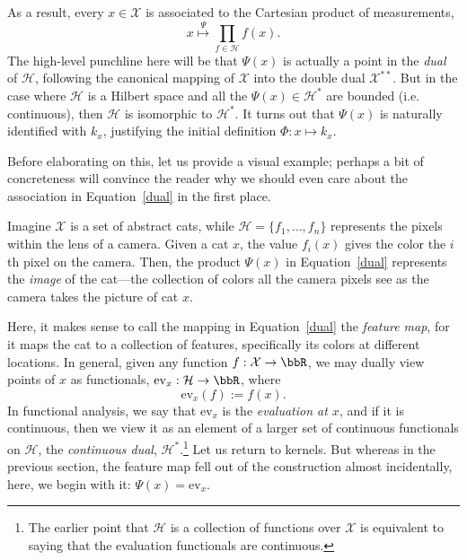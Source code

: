 \documentclass[twoside,11pt]{homework}
\begin{document}
\begin{multicols}{2}
As a result, every $x \in \mathcal{X}$ is associated to the Cartesian product of measurements,
\begin{equation}\label{dual}
  x \overset{\Psi}{\mapsto}\prod_{f \in \mathcal{H}} f(x).
\end{equation}
The high-level punchline here will be that $\Psi(x)$ is actually a point in the \emph{dual} of $\mathcal{H}$, following the canonical mapping of $\mathcal{X}$ into the double dual $\mathcal{X}^{**}$. But in the case where $\mathcal{H}$ is a Hilbert space and all the $\Psi(x) \in \mathcal{H}^*$ are bounded (i.e. continuous), then $\mathcal{H}$ is isomorphic to $\mathcal{H}^*$. It turns out that $\Psi(x)$ is naturally identified with $k_x$, justifying the initial definition $\Phi : x \mapsto k_x$.

Before elaborating on this, let us provide a visual example; perhaps a bit of concreteness will convince the reader why we should even care about the association in Equation~\ref{dual} in the first place.

Imagine $\mathcal{X}$ is a set of abstract cats, while $\mathcal{H} = \{f_1,\dotsc, f_n\}$ represents the pixels within the lens of a camera. Given a cat $x$, the value $f_i(x)$ gives the color the $i$th pixel on the camera. Then, the product $\Psi(x)$ in Equation~\ref{dual} represents the \emph{image} of the cat---the collection of colors all the camera pixels see as the camera takes the picture of cat $x$.

Here, it makes sense to call the mapping in Equation~\ref{dual} the \emph{feature map}, for it maps the cat to a collection of features, specifically its colors at different locations. In general, given any function $f : \mathcal{X} \to \bbR$, we may dually view points of $x$ as functionals, $\mathrm{ev}_x : \mathcal{H} \to \bbR$, where
\[\mathrm{ev}_x(f) := f(x).\]
In functional analysis, we say that $\mathrm{ev}_x$ is the \emph{evaluation at $x$}, and if it is continuous, then we view it as an element of a larger set of continuous functionals on $\mathcal{H}$, the \emph{continuous dual}, $\mathcal{H}^*$.\footnote{The earlier point that $\mathcal{H}$ is a collection of functions over $\mathcal{X}$ is equivalent to saying that the evaluation functionals are continuous.} Let us return to kernels. But whereas in the previous section, the feature map fell out of the construction almost incidentally, here, we begin with it: $\Psi(x) = \mathrm{ev}_x$.


\end{multicols}
\end{document}
